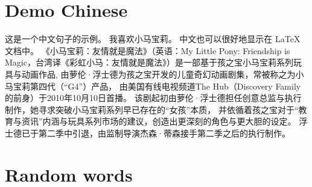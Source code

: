 \documentclass{article}
\begin{document}
\section{Demo Chinese}
这是一个中文句子的示例。
我喜欢小马宝莉。
中文也可以很好地显示在 LaTeX 文档中。
《小马宝莉：友情就是魔法》（英语：My Little Pony: Friendship is Magic，台湾译《彩虹小马：友情就是魔法》）是一部基于孩之宝小马宝莉系列玩具与动画作品,
由萝伦·浮士德为孩之宝开发的儿童奇幻动画剧集，常被称之为小马宝莉第四代（“G4”）产品，
由美国有线电视频道The Hub（Discovery Family的前身）于2010年10月10日首播。
该剧起初由萝伦·浮士德担任创意总监与执行制作，她寻求突破小马宝莉系列早已存在的“女孩”本质，
并依循着孩之宝对于“教育与资讯”内涵与玩具系列市场的建议，创造出更深刻的角色与更大胆的设定。
浮士德已于第二季中引退，由监制导演杰森·蒂森接手第二季之后的执行制作。
\section{Random words}
\lipsum[9-40]
\end{document}
